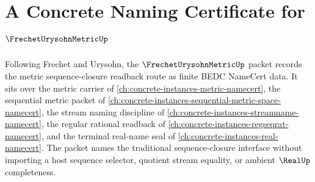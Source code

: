 \chapter{A Concrete Naming Certificate for $\FrechetUrysohnMetricUp$}
\label{ch:concrete-instances-frechet-urysohn-metric-namecert}

Following Frechet and Urysohn, the $\FrechetUrysohnMetricUp$ packet records the metric sequence-closure readback route as finite BEDC NameCert data. It sits over the metric carrier of \autoref{ch:concrete-instances-metric-namecert}, the sequential metric packet of \autoref{ch:concrete-instances-sequential-metric-space-namecert}, the stream naming discipline of \autoref{ch:concrete-instances-streamname-namecert}, the regular rational readback of \autoref{ch:concrete-instances-regseqrat-namecert}, and the terminal real-name seal of \autoref{ch:concrete-instances-real-namecert}. The packet names the traditional sequence-closure interface without importing a host sequence selector, quotient stream equality, or ambient $\RealUp$ completeness.

